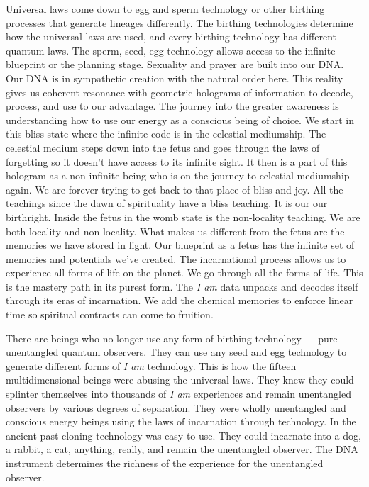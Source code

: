Universal laws come down to egg and sperm technology or other birthing
processes that generate lineages differently. The birthing technologies
determine how the universal laws are used, and every birthing technology
has different quantum laws. The sperm, seed, egg technology allows
access to the infinite blueprint or the planning stage. Sexuality and
prayer are built into our DNA. Our DNA is in sympathetic creation with
the natural order here. This reality gives us coherent resonance with
geometric holograms of information to decode, process, and use to our
advantage. The journey into the greater awareness is understanding how
to use our energy as a conscious being of choice. We start in this bliss
state where the infinite code is in the celestial mediumship. The
celestial medium steps down into the fetus and goes through the laws of
forgetting so it doesn't have access to its infinite sight. It then is a
part of this hologram as a non-infinite being who is on the journey to
celestial mediumship again. We are forever trying to get back to that
place of bliss and joy. All the teachings since the dawn of spirituality
have a bliss teaching. It is our our birthright. Inside the fetus in the
womb state is the non-locality teaching. We are both locality and
non-locality. What makes us different from the fetus are the memories we
have stored in light. Our blueprint as a fetus has the infinite set of
memories and potentials we've created. The incarnational process allows
us to experience all forms of life on the planet. We go through all the
forms of life. This is the mastery path in its purest form. The \emph{I
am} data unpacks and decodes itself through its eras of incarnation. We
add the chemical memories to enforce linear time so spiritual contracts
can come to fruition.

There are beings who no longer use any form of birthing technology ---
pure unentangled quantum observers. They can use any seed and egg
technology to generate different forms of \emph{I am} technology. This
is how the fifteen multidimensional beings were abusing the universal
laws. They knew they could splinter themselves into thousands of \emph{I
am} experiences and remain unentangled observers by various degrees of
separation. They were wholly unentangled and conscious energy beings
using the laws of incarnation through technology. In the ancient past
cloning technology was easy to use. They could incarnate into a dog, a
rabbit, a cat, anything, really, and remain the unentangled observer.
The DNA instrument determines the richness of the experience for the
unentangled observer.

